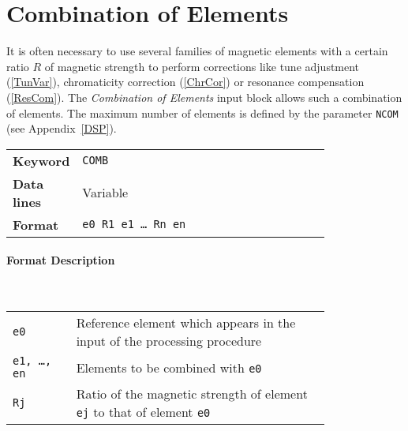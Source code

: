 \section{Combination of Elements} \label{ComEle}

It is often necessary to use several families of magnetic elements with a certain ratio $R$ of magnetic strength to perform corrections like tune adjustment (\ref{TunVar}), chromaticity correction (\ref{ChrCor}) or resonance compensation (\ref{ResCom}).
The \textit{Combination of Elements} input block allows such a combination of elements.
The maximum number of elements is defined by the parameter \texttt{NCOM} (see Appendix~\ref{DSP}).

\bigskip
\begin{tabular}{@{}lp{0.8\linewidth}}
    \textbf{Keyword}    & \texttt{COMB} \\
    \textbf{Data lines} & Variable \\
    \textbf{Format}     & \texttt{e0 R1 e1 \dots~Rn en}
\end{tabular}

\paragraph{Format Description}~

\bigskip
\begin{tabular}{@{}lp{0.8\linewidth}}
    \texttt{e0} & Reference element which appears in the input of the processing procedure \\
    \texttt{e1, \dots, en} & Elements to be combined with \texttt{e0} \\
    \texttt{Rj} & Ratio of the magnetic strength of element \texttt{ej} to that of element \texttt{e0}
\end{tabular}


